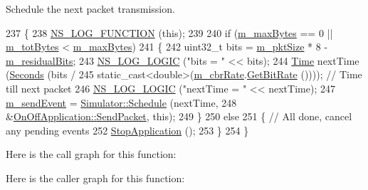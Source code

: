 Schedule the next packet transmission. 


\begin{DoxyCode}
237 \{
238   \hyperlink{log-macros-disabled_8h_a90b90d5bad1f39cb1b64923ea94c0761}{NS\_LOG\_FUNCTION} (\textcolor{keyword}{this});
239 
240   \textcolor{keywordflow}{if} (\hyperlink{classns3_1_1OnOffApplication_a91d36bea04deb7139344300a2a9f9482}{m\_maxBytes} == 0 || \hyperlink{classns3_1_1OnOffApplication_ab43f8091f6fac16d5aed373e7e35c739}{m\_totBytes} < \hyperlink{classns3_1_1OnOffApplication_a91d36bea04deb7139344300a2a9f9482}{m\_maxBytes})
241     \{
242       uint32\_t bits = \hyperlink{classns3_1_1OnOffApplication_a245613852fed52486699a56f0a4984e6}{m\_pktSize} * 8 - \hyperlink{classns3_1_1OnOffApplication_a0c9bb1d89244488cd37b4a77ce4bcb45}{m\_residualBits};
243       \hyperlink{group__logging_ga88acd260151caf2db9c0fc84997f45ce}{NS\_LOG\_LOGIC} (\textcolor{stringliteral}{"bits = "} << bits);
244       \hyperlink{namespacens3_1_1TracedValueCallback_a7ffd3e7c142ffe7c8a1d2db9b8de38ec}{Time} nextTime (\hyperlink{group__timecivil_ga33c34b816f8ff6628e33d5c8e9713b9e}{Seconds} (bits /
245                               static\_cast<double>(\hyperlink{classns3_1_1OnOffApplication_ae81a8be6c1ce4bef91e89cc2c44e5bcf}{m\_cbrRate}.\hyperlink{classns3_1_1DataRate_a88e27dcc6e633584dac99fa5988612bc}{GetBitRate} ()))); \textcolor{comment}{// Time
       till next packet}
246       \hyperlink{group__logging_ga88acd260151caf2db9c0fc84997f45ce}{NS\_LOG\_LOGIC} (\textcolor{stringliteral}{"nextTime = "} << nextTime);
247       \hyperlink{classns3_1_1OnOffApplication_a1484aba0405bef3aaf9f7904764c50f4}{m\_sendEvent} = \hyperlink{classns3_1_1Simulator_a671882c894a08af4a5e91181bf1eec13}{Simulator::Schedule} (nextTime,
248                                          &\hyperlink{classns3_1_1OnOffApplication_afe6fb4d4e772370c797b722dbe6f7e3f}{OnOffApplication::SendPacket}, \textcolor{keyword}{this});
249     \}
250   \textcolor{keywordflow}{else}
251     \{ \textcolor{comment}{// All done, cancel any pending events}
252       \hyperlink{classns3_1_1OnOffApplication_a944980f8e00a8dcfb14fd4d915396ef7}{StopApplication} ();
253     \}
254 \}
\end{DoxyCode}


Here is the call graph for this function\+:




Here is the caller graph for this function\+:


